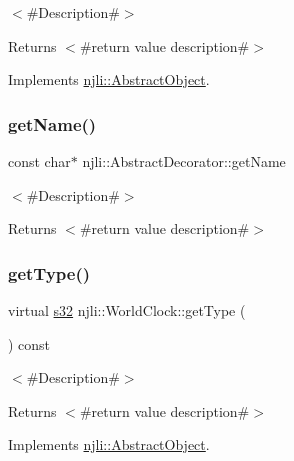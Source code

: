 $<$\#\+Description\#$>$

\begin{DoxyReturn}{Returns}
$<$\#return value description\#$>$ 
\end{DoxyReturn}


Implements \mbox{\hyperlink{classnjli_1_1_abstract_object_afdabb48c4bf763e297ffe810b433a863}{njli\+::\+Abstract\+Object}}.

\mbox{\label{classnjli_1_1_world_clock_ad41266885be835f3ee602311e20877a4}} 
\subsubsection{\texorpdfstring{get\+Name()}{getName()}}
{\footnotesize\ttfamily const char$\ast$ njli\+::\+Abstract\+Decorator\+::get\+Name}

$<$\#\+Description\#$>$

\begin{DoxyReturn}{Returns}
$<$\#return value description\#$>$ 
\end{DoxyReturn}
\mbox{\label{classnjli_1_1_world_clock_ada98188afadfa5dc712d96a0d12f56a2}} 
\subsubsection{\texorpdfstring{get\+Type()}{getType()}}
{\footnotesize\ttfamily virtual \mbox{\hyperlink{_util_8h_aa62c75d314a0d1f37f79c4b73b2292e2}{s32}} njli\+::\+World\+Clock\+::get\+Type (\begin{DoxyParamCaption}{ }\end{DoxyParamCaption}) const\hspace{0.3cm}{\ttfamily [virtual]}}

$<$\#\+Description\#$>$

\begin{DoxyReturn}{Returns}
$<$\#return value description\#$>$ 
\end{DoxyReturn}


Implements \mbox{\hyperlink{classnjli_1_1_abstract_object_a08dcf202a47f0782813b8bc98c659e78}{njli\+::\+Abstract\+Object}}.

